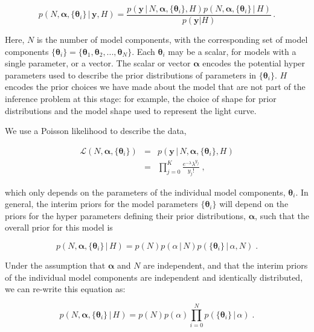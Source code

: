 \documentclass[12pt]{emulateapj}
\newcommand{\given}{\,|\,}
\newcommand{\counts}{y}
\newcommand{\likelihood}{{\mathcal L}}
\begin{document}
\begin{equation}
p(N, \bm{\alpha},\{\bm{\theta}_i \} \given \bm{\counts}, H) = \frac{p(\bm{\counts} \given N, \bm{\alpha}, \{\bm{\theta}_i \}, H) p(N, \bm{\alpha}, \{\bm{\theta}_i \} \given H)}{p(\bm{\counts} | H)} \, .
\end{equation}

Here, $N$ is the number of model components, with the corresponding set of model components $\{\bm{\theta}_i\} = \{ \bm{\theta}_1, \bm{\theta}_2, ..., \bm{\theta}_N \}$. Each $\bm{\theta}_i$ may be a scalar, for models with a single parameter, or a vector.
The scalar or vector $\bm{\alpha}$ encodes the potential hyper parameters used to describe the prior distributions of parameters in $\{\bm{\theta}_i\}$. $H$ encodes the prior choices we have
made about the model that are not part of the inference problem at this stage: for example, the choice of shape for prior distributions and the model shape used to represent the light curve.

We use a Poisson likelihood to describe the data,

\begin{eqnarray}
\likelihood(N, \bm{\alpha}, \{\bm{\theta}_i \}) & = & p(\bm{\counts} \given N, \bm{\alpha}, \{\bm{\theta}_i \}, H) \\ \nonumber
 &= & \prod\limits_{j=0}^{K}{ \frac{e^{-\lambda} \lambda^{y_j} }{y_j! }} \; ,
\end{eqnarray}

which only depends on the parameters of the individual model components, $\bm{\theta}_i$. In general, the interim priors for the model 
parameters $\{\bm{\theta}_i\}$ will depend on the priors for the hyper parameters defining their prior distributions, $\bm{\alpha}$, such that the
overall prior for this model is

\begin{equation}
p(N, \bm{\alpha}, \{\bm{\theta}_i \} \given H) = p(N)p(\alpha\given N)p(\{\bm{\theta}_i\}\given \alpha, N) \; .
\end{equation}

Under the assumption that $\bm{\alpha}$ and $N$ are independent, and that the interim priors of the individual model components are
independent and identically distributed, we can re-write this equation as:

\begin{equation}
p(N, \bm{\alpha}, \{\bm{\theta}_i \} \given H) = p(N)p(\alpha) \prod\limits_{i=0}^{N}  p(\{\bm{\theta}_i\}\given \alpha) \; .
\end{equation}
\end{document}
